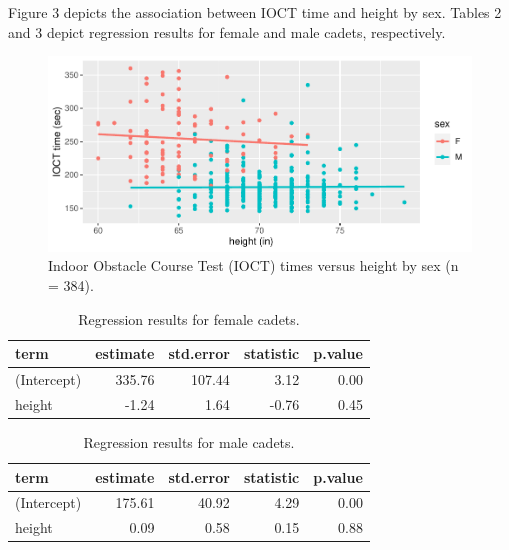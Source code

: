 \documentclass[
]{book}
\begin{document}
\vspace{1in}

\newpage

Figure 3 depicts the association between IOCT time and height by sex. Tables 2 and 3 depict regression results for female and male cadets, respectively.

\begin{figure}
\centering
\includegraphics{MA206supplement_files/figure-latex/unnamed-chunk-18-1.pdf}
\caption{\label{fig:unnamed-chunk-18}Indoor Obstacle Course Test (IOCT) times versus height by sex (n = 384).}
\end{figure}

\begin{table}

\caption{\label{tab:unnamed-chunk-19}Regression results for female cadets.}
\centering
\begin{tabular}[t]{l|r|r|r|r}
\hline
term & estimate & std.error & statistic & p.value\\
\hline
(Intercept) & 335.76 & 107.44 & 3.12 & 0.00\\
\hline
height & -1.24 & 1.64 & -0.76 & 0.45\\
\hline
\end{tabular}
\end{table}

\begin{table}

\caption{\label{tab:unnamed-chunk-19}Regression results for male cadets.}
\centering
\begin{tabular}[t]{l|r|r|r|r}
\hline
term & estimate & std.error & statistic & p.value\\
\hline
(Intercept) & 175.61 & 40.92 & 4.29 & 0.00\\
\hline
height & 0.09 & 0.58 & 0.15 & 0.88\\
\hline
\end{tabular}
\end{table}
\end{document}
